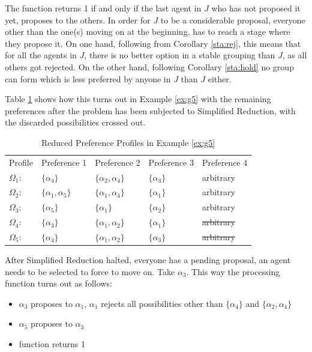\documentclass{elsarticle}
\begin{document}
The function returns 1 if and only if the last agent in $J$ who has not proposed it yet, proposes to the others. In order for $J$ to be a considerable proposal, everyone other than the one(s) moving on at the beginning, has to reach a stage where they propose it. On one hand, following from Corollary \ref{sta:rej}, this means that for all the agents in $J$, there is no better option in a stable grouping than $J$, as all others got rejected. On the other hand, following Corollary \ref{sta:hold} no group can form which is less preferred by anyone in $J$ than $J$ either.

Table \ref{tab:g5red} shows how this turns out in Example \ref{ex:g5} with the remaining preferences after the problem has been subjected to Simplified Reduction, with the discarded possibilities crossed out.


\begin{table}[h]
\centering
\caption{Reduced Preference Profiles in Example \ref{ex:g5}}
\label{tab:g5red}
\begin{tabular}{lllll}
Profile     & Preference 1              & Preference 2              & Preference 3   & Preference 4 \\
$\Omega_1$: & $\{\alpha_4\}$            & $\{\alpha_2 , \alpha_4\}$ & $\{\alpha_3\}$ & arbitrary    \\
$\Omega_2$: & $\{\alpha_1 , \alpha_5\}$ & $\{\alpha_1 , \alpha_4\}$ & $\{\alpha_1\}$ & arbitrary    \\
$\Omega_3$: & $\{\alpha_5\}$            & $\{\alpha_1\}$            & $\{\alpha_2\}$ & arbitrary    \\
$\Omega_4$: & $\{\alpha_3\}$            & $\{\alpha_1 , \alpha_2\}$ & $\{\alpha_1\}$ & \sout{arbitrary}    \\
$\Omega_5$: & \sout{$\{\alpha_4\}$}            & $\{\alpha_1 , \alpha_2\}$ & $\{\alpha_3\}$ & \sout{arbitrary}   
\end{tabular}
\end{table}

After Simplified Reduction halted, everyone has a pending proposal, an agent needs to be selected to force to move on. Take $\alpha_3$. This way the processing function turns out as follows:

\begin{itemize}
\item $\alpha_3$ proposes to $\alpha_1$, $\alpha_1$ rejects all possibilities other than $\{\alpha_4\}$ and $\{\alpha_2 , \alpha_4\}$
\item $\alpha_5$ proposes to $\alpha_3$
\item function returns 1
\end{itemize}
\end{document}
